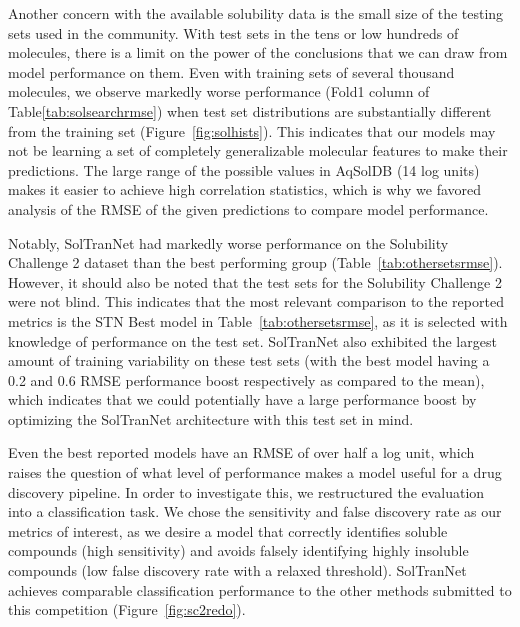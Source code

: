 \documentclass[journal=jmcmar,manuscript=article]{achemso}
\begin{document}
Another concern with the available solubility data is the small size of the testing sets used in the community.
With test sets in the tens or low hundreds of molecules, there is a limit on the power of the conclusions that we can draw from model performance on them.
Even with training sets of several thousand molecules, we observe markedly worse performance (Fold1 column of Table\ref{tab:solsearchrmse}) when test set distributions are substantially different from the training set (Figure~\ref{fig:solhists}).
This indicates that our models may not be learning a set of completely generalizable molecular features to make their predictions.
The large range of the possible values in AqSolDB (14 log units) makes it easier to achieve high correlation statistics, which is why we favored analysis of the RMSE of the given predictions to compare model performance.

Notably, SolTranNet had markedly worse performance on the Solubility Challenge 2 dataset than the best performing group (Table~\ref{tab:othersetsrmse}).
However, it should also be noted that the test sets for the Solubility Challenge 2 were not blind.
This indicates that the most relevant comparison to the reported metrics is the STN Best model in Table~\ref{tab:othersetsrmse}, as it is selected with knowledge of performance on the test set.
SolTranNet also exhibited the largest amount of training variability on these test sets (with the best model having a 0.2 and 0.6 RMSE performance boost respectively as compared to the mean), which indicates that we could potentially have a large performance boost by optimizing the SolTranNet architecture with this test set in mind.

Even the best reported models have an RMSE of over half a log unit, which raises the question of what level of performance makes a model useful for a drug discovery pipeline.
In order to investigate this, we restructured the evaluation into a classification task.
We chose the sensitivity and false discovery rate as our metrics of interest, as we desire a model that correctly identifies soluble compounds (high sensitivity) and avoids falsely identifying highly insoluble compounds (low false discovery rate with a relaxed threshold).
SolTranNet achieves comparable classification performance to the other methods submitted to this competition (Figure~\ref{fig:sc2redo}).
\end{document}
